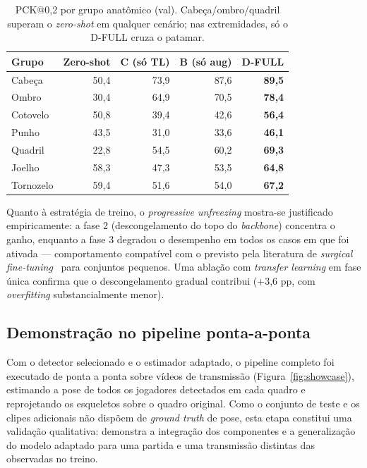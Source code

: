 \documentclass[12pt]{article}
\begin{document}
\begin{table}[ht]
\centering
\caption{PCK@0,2 por grupo anatômico (val). Cabeça/ombro/quadril superam o \emph{zero-shot} em qualquer cenário; nas extremidades, só o D-FULL cruza o patamar.}
\label{tab:grupos}
\begin{tabular}{lrrrr}
\toprule
Grupo & Zero-shot & C (só TL) & B (só aug) & \textbf{D-FULL} \\
\midrule
Cabeça & 50,4 & 73,9 & 87,6 & \textbf{89,5} \\
Ombro & 30,4 & 64,9 & 70,5 & \textbf{78,4} \\
Cotovelo & 50,8 & 39,4 & 42,6 & \textbf{56,4} \\
Punho & 43,5 & 31,0 & 33,6 & \textbf{46,1} \\
Quadril & 22,8 & 54,5 & 60,2 & \textbf{69,3} \\
Joelho & 58,3 & 47,3 & 53,5 & \textbf{64,8} \\
Tornozelo & 59,4 & 51,6 & 54,0 & \textbf{67,2} \\
\bottomrule
\end{tabular}
\end{table}

Quanto à estratégia de treino, o \emph{progressive unfreezing} mostra-se justificado empiricamente: a fase 2 (descongelamento do topo do \emph{backbone}) concentra o ganho, enquanto a fase 3 degradou o desempenho em todos os casos em que foi ativada --- comportamento compatível com o previsto pela literatura de \emph{surgical fine-tuning}~\cite{lee2023} para conjuntos pequenos. Uma ablação com \emph{transfer learning} em fase única confirma que o descongelamento gradual contribui ($+$3,6 pp, com \emph{overfitting} substancialmente menor).

\subsection{Demonstração no pipeline ponta-a-ponta}

Com o detector selecionado e o estimador adaptado, o pipeline completo foi executado de ponta a ponta sobre vídeos de transmissão (Figura~\ref{fig:showcase}), estimando a pose de todos os jogadores detectados em cada quadro e reprojetando os esqueletos sobre o quadro original. Como o conjunto de teste e os clipes adicionais não dispõem de \emph{ground truth} de pose, esta etapa constitui uma validação qualitativa: demonstra a integração dos componentes e a generalização do modelo adaptado para uma partida e uma transmissão distintas das observadas no treino.
\end{document}
